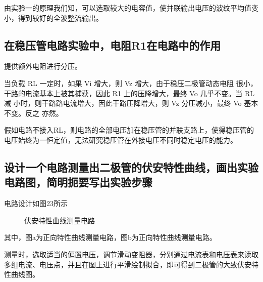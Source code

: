 \documentclass[a4paper,11pt,UTF8]{ctexart}
\begin{document}
	由实验一的原理我们知，可以选取较大的电容值，使并联输出电压的波纹平均值变小，得到较好的全波整流输出。
	
	\subsection{在稳压管电路实验中，电阻R1在电路中的作用}
	提供额外电阻进行分压。
	
	当负载 RL 一定时，如果 Vi 增大，则 Vz 增大，由于稳压二极管动态电阻
	很小，干路的电流基本上被其捕获，因此 R1 上的压降增大，最终 Vo 几乎不变。当 RL 减
	小时，则干路路电流增大，因此干路压降增大，则 Vz 分压减小，最终 Vo 基本不变。反之
	亦然。
	
	假如电路不接入RL，则电路的全部电压加在稳压管的并联支路上，使得稳压管的电压始终为一恒定值，无法研究稳压管在外接电压不同时稳定电压的能力。
	
	\subsection{设计一个电路测量出二极管的伏安特性曲线，画出实验电路图，简明扼要写出实验步骤}
	电路设计如图23所示
	\begin{figure}[H]
		\centering
		\caption{伏安特性曲线测量电路}
		\label{additional2}
	\end{figure}
	其中，图a为正向特性曲线测量电路，图b为正向特性曲线测量电路。
	
	测量时，选取适当的偏置电压，调节滑动变阻器，分别通过电流表和电压表来读取多组电流、电压点，并且在图上进行平滑绘制拟合，即可得到二极管的大致伏安特性曲线图。
	
\end{document}
